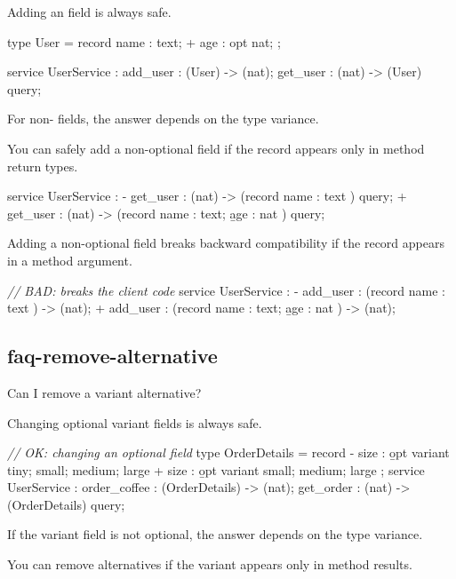 \documentclass{article}
\begin{document}
Adding an  field is always safe.

\begin{code}[good]
 type User = record {
   name : text;
+  age : opt nat;
};

 service UserService : {
  add_user : (User) -> (nat);
  get_user : (nat) -> (User) query;
 }
\end{code}

For non- fields, the answer depends on the type variance.

You can safely add a non-optional field if the record appears only in method return types.
\begin{code}[good]
 service UserService : {
-  get_user : (nat) -> (record { name : text            }) query;
+  get_user : (nat) -> (record { name : text; \b{age : nat} }) query;
 }
\end{code}

Adding a non-optional field breaks backward compatibility if the record appears in a method argument.

\begin{code}[bad]
 \emph{// BAD: breaks the client code}
 service UserService : {
-  add_user : (record { name : text            }) -> (nat);
+  add_user : (record { name : text; \b{age : nat} }) -> (nat);
 }
\end{code}

\subsection{faq-remove-alternative}{Can I remove a variant alternative?}

Changing optional variant fields is always safe.

\begin{code}[good]
 \emph{// OK: changing an optional field}
 type OrderDetails = record {
-  size : \b{opt} variant { tiny; small; medium; large }
+  size : \b{opt} variant {       small; medium; large }
 };
 service UserService : {
   order_coffee : (OrderDetails) -> (nat);
   get_order : (nat) -> (OrderDetails) query;
 }
\end{code}

If the variant field is not optional, the answer depends on the type variance.

You can remove alternatives if the variant appears only in method results.
\end{document}
